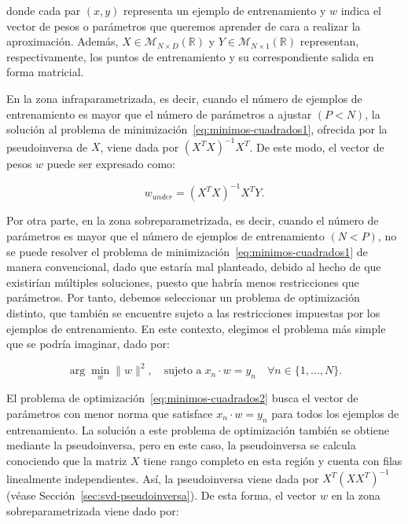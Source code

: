 donde cada par $(x, y)$ representa un ejemplo de entrenamiento y $w$ indica el vector de pesos o parámetros que queremos aprender de cara a realizar la aproximación. Además, $X \in \mathcal{M}_{N \times D}(\mathbb{R})$ y $Y\in \mathcal{M}_{N \times 1}(\mathbb{R})$ representan, respectivamente, los puntos de entrenamiento y su correspondiente salida en forma matricial.

En la zona infraparametrizada, es decir, cuando el número de ejemplos de entrenamiento es mayor que el número de parámetros a ajustar $(P < N)$, la solución al problema de minimización~\eqref{eq:minimos-cuadrados1}, ofrecida por la pseudoinversa de $X$, viene dada por ${(X^{T}X)}^{-1}X^{T}$. De este modo, el vector de pesos $w$ puede ser expresado como:

\begin{equation}
    w_{under} = {(X^{T}X)}^{-1}X^{T}Y.
\end{equation}

Por otra parte, en la zona sobreparametrizada, es decir, cuando el número de parámetros es mayor que el número de ejemplos de entrenamiento $(N < P)$, no se puede resolver el problema de minimización~\eqref{eq:minimos-cuadrados1} de manera convencional, dado que estaría mal planteado, debido al hecho de que existirían múltiples soluciones, puesto que habría menos restricciones que parámetros. Por tanto, debemos seleccionar un problema de optimización distinto, que también se encuentre sujeto a las restricciones impuestas por los ejemplos de entrenamiento. En este contexto, elegimos el problema más simple que se podría imaginar, dado por:

\begin{equation}\label{eq:minimos-cuadrados2}
    \arg\min_{w}\| w \|^{2}, \quad \text{sujeto a} \; x_n \cdot w = y_n \quad \forall n \in \{1, \ldots, N\}.
\end{equation}

El problema de optimización~\eqref{eq:minimos-cuadrados2} busca el vector de parámetros con menor norma que satisface $x_n \cdot w = y_n$ para todos los ejemplos de entrenamiento. La solución a este problema de optimización también se obtiene mediante la pseudoinversa, pero en este caso, la pseudoinversa se calcula conociendo que la matriz $X$ tiene rango completo en esta región y cuenta con filas linealmente independientes. Así, la pseudoinversa viene dada por $X^{T}{(XX^{T})}^{-1}$ (véase Sección~\ref{sec:svd-pseudoinversa}). De esta forma, el vector $w$ en la zona sobreparametrizada viene dado por:

